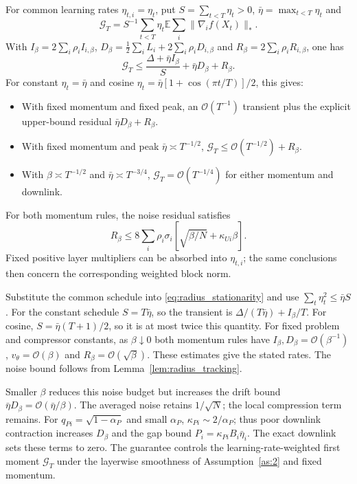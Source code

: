 \begin{codex}
\begin{corollary}\label{cor:radius_schedules}
For common learning rates $\eta_{t,i}=\eta_t$, put
$S=\sum_{t<T}\eta_t>0$, $\bar\eta=\max_{t<T}\eta_t$ and
\[
 \mathcal G_T=S^{-1}\sum_{t<T}\eta_t
                \mathbb E\sum_i\|\nabla_i f(X_t)\|_*.
\]
With $I_\beta=2\sum_i\rho_i I_{i,\beta}$,
$D_\beta=\tfrac12\sum_iL_i+2\sum_i\rho_iD_{i,\beta}$ and
$R_\beta=2\sum_i\rho_iR_{i,\beta}$, one has
\begin{equation}\label{eq:radius_takeaway}
 \mathcal G_T\le\frac{\Delta+\bar\eta I_\beta}{S}
                       +\bar\eta D_\beta+R_\beta.
\end{equation}
For constant $\eta_t=\bar\eta$ and cosine
$\eta_t=\bar\eta[1+\cos(\pi t/T)]/2$, this gives:
\begin{itemize}
\item[\emph{(i)}] With fixed momentum and fixed peak, an
$\mathcal O(T^{-1})$ transient plus the explicit upper-bound residual
$\bar\eta D_\beta+R_\beta$.
\item[\emph{(ii)}] With fixed momentum and peak $\bar\eta\asymp T^{-1/2}$,
$\mathcal G_T\le\mathcal O(T^{-1/2})+R_\beta$.
\item[\emph{(iii)}] With $\beta\asymp T^{-1/2}$ and $\bar\eta\asymp T^{-3/4}$,
$\mathcal G_T=\mathcal O(T^{-1/4})$ for either momentum and downlink.
\end{itemize}
For both momentum rules, the noise residual satisfies
\[
 R_\beta\le8\sum_i\rho_i\sigma_i
       [\sqrt{\beta/N}+\kappa_{Ui}\beta].
\]
Fixed positive layer multipliers can be absorbed into $\eta_{t,i}$;
the same conclusions then concern the corresponding weighted block norm.
\end{corollary}
\begin{paperproof}
Substitute the common schedule into \eqref{eq:radius_stationarity}
and use $\sum_t\eta_t^2\le\bar\eta S$.
For the constant schedule $S=T\bar\eta$, so the transient is
$\Delta/(T\bar\eta)+I_\beta/T$.
For cosine, $S=\bar\eta(T+1)/2$, so it is at most twice this quantity.
For fixed problem and compressor constants, as $\beta\downarrow0$
both momentum rules have $I_\beta,D_\beta=\mathcal O(\beta^{-1})$,
$v_\theta=\mathcal O(\beta)$ and $R_\beta=\mathcal O(\sqrt\beta)$.
These estimates give the stated rates. The noise bound follows from
Lemma~\ref{lem:radius_tracking}.
\end{paperproof}

Smaller $\beta$ reduces this noise budget but increases the drift bound
$\bar\eta D_\beta=\mathcal O(\bar\eta/\beta)$.
The averaged noise retains $1/\sqrt N$; the local compression term remains.
For $q_{Pi}=\sqrt{1-\alpha_P}$ and small $\alpha_P$,
$\kappa_{Pi}\sim2/\alpha_P$;
thus poor downlink contraction increases $D_\beta$ and the gap bound
$P_i=\kappa_{Pi}B_i\bar\eta_i$. The exact downlink sets these terms
to zero. The guarantee controls the learning-rate-weighted first moment
$\mathcal G_T$ under the layerwise smoothness of Assumption~\ref{as:2}
and fixed momentum.
\end{codex}
